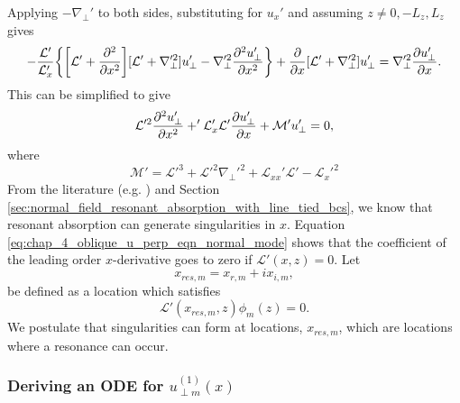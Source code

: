 Applying $-\nabla_\perp'$ to both sides, substituting for $u_x'$ and assuming $z\ne0,-L_z,L_z$ gives
\[-\frac{\mathcal{L}'}{\mathcal{L}_x'}\qty{\qty[\mathcal{L}'+\pdv[2]{}{x}][\mathcal{L}'+\nabla_\perp'^2]u_\perp'-\nabla_\perp'^2\pdv[2]{u_\perp'}{x}}+\pdv{}{x}[\mathcal{L}'+\nabla_\perp'^2]u_\perp'=\nabla_\perp'^2\pdv{u_\perp'}{x}.\]
This can be simplified to give
\begin{equation}
    \label{eq:chap_4_oblique_u_perp_eqn_normal_mode}
     \mathcal{L}'^2\pdv[2]{u_\perp'}{x}+'\mathcal{L}_x'\mathcal{L}'\pdv{u_\perp'}{x}+\mathcal{M}'u_\perp'=0,
\end{equation}
where
\begin{equation}
    \mathcal{M}' = \mathcal{L}'^3+\mathcal{L}'^2\nabla_\perp'^2+\mathcal{L}_{xx}'\mathcal{L}'-\mathcal{L}_x'^2
\end{equation}
From the literature (e.g. \citealt{Thompson1993,Wright1996}) and Section \ref{sec:normal_field_resonant_absorption_with_line_tied_bcs}, we know that resonant absorption can generate singularities in $x$. Equation \eqref{eq:chap_4_oblique_u_perp_eqn_normal_mode} shows that the coefficient of the leading order $x$-derivative goes to zero if $\mathcal{L}'(x,z)=0$. Let
\[x_{res,m} = x_{r,m} + i x_{i,m},\]
be defined as a location which satisfies
\begin{equation}
    \label{eq:x_res_defn}
    \mathcal{L}'(x_{res,m},z)\phi_m(z)=0.
\end{equation}
We postulate that singularities can form at locations, $x_{res,m}$, which are locations where a resonance can occur.

\subsubsection{Deriving an ODE for $u_{\perp m}^{(1)}(x)$}

